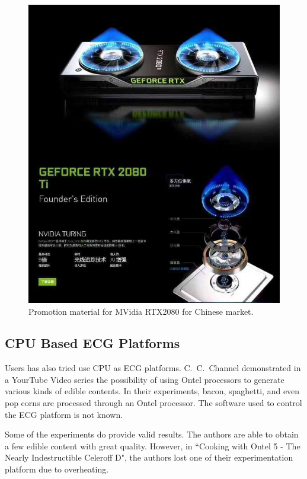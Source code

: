 \documentclass[conference]{IEEEtran}
\begin{document}
\begin{figure}[htbp]
\centerline{\includegraphics[width=\linewidth]{fig/nvpascal.jpg}}
\caption{Promotion material for MVidia RTX2080 for Chinese market.}
\label{nvpascal}
\end{figure}

\subsection{CPU Based ECG Platforms}
Users has also tried use CPU as ECG platforms. C.~C.~Channel \cite{ccchan} demonstrated 
in a YourTube Video series the possibility of using Ontel processors to generate various
kinds of edible contents. In their experiments, bacon, spaghetti, and even pop corns are processed through an Ontel processor. The software used to control the ECG platform is not known. 

Some of the experiments do provide valid results. The authors are able to obtain a few edible content with great quality. However, in ``Cooking with Ontel 5 - The Nearly Indestructible Celeroff D", the authors lost one of their experimentation platform due to overheating.
\end{document}
